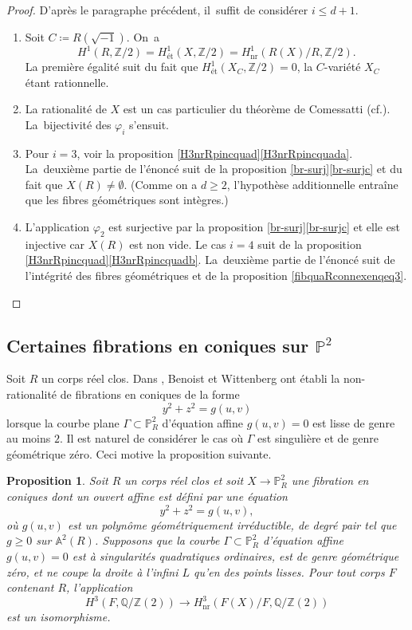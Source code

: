 \documentclass[11pt]{article}
\newcommand{\cf}{cf.\xspace}
\newenvironment{enumeratea}
{\bgroup\def\theenumi{\alph{enumi}}\begin{enumerate}}
{\end{enumerate}\egroup}
\newtheorem{prop}[thm]{Proposition}
\theoremstyle{definition}
\newcommand{\Q}{\mathbb Q}
\newcommand{\Z}{\mathbb Z}
\newcommand{\A}{\mathbb A}
\renewcommand{\P}{\mathbb P}
\newcommand{\on}[1]{\operatorname{#1}}
\let\phi\varphi
\begin{document}
\begin{proof}
D'après le paragraphe précédent, il~suffit de considérer $i\leq d+1$.

\begin{enumeratea}
\item\label{pf:a}
Soit $C\coloneqq R(\sqrt{-1})$. On~a
\[H^1(R,\Z/2)=H^1_{\text{ét}}(X,\Z/2)=H^1_{\on{nr}}(R(X)/R,\Z/2).\]
La première égalité suit du fait que $H^1_{\text{ét}}(X_C,\Z/2)=0$, la $C$-variété $X_C$ étant rationnelle.

\item\label{pf:b}
La rationalité de $X$ est un cas particulier du théorème de Comessatti \cite{comessatti1912fondamenti} (\cf \cite[\S10.2]{colliot2024certaines}). La~bijectivité des $\phi_i$ s'ensuit.

\item\label{pf:c}
Pour $i=3$, voir la proposition \ref{H3nrRpincquad}\eqref{H3nrRpincquada}. La~deuxième partie de l'énoncé suit de la proposition \ref{br-surj}\eqref{br-surjc} et du fait que $X(R)\neq \emptyset$. (Comme on a $d\geq 2$, l'hypothèse additionnelle entraîne que les fibres géométriques sont intègres.)

\item\label{pf:d}
L'application $\phi_2$ est surjective par la proposition \ref{br-surj}\eqref{br-surjc} et elle est injective car $X(R)$ est non vide. Le cas $i=4$ suit de la proposition \ref{H3nrRpincquad}\eqref{H3nrRpincquadb}. La~deuxième partie de l'énoncé suit de l’intégrité des fibres géométriques et de la proposition \ref{fibquaRconnexenqeq3}.\qedhere
\end{enumeratea}
\end{proof}

\subsection{Certaines fibrations en coniques sur \texorpdfstring{$\P^2$}{P2}}
Soit $R$ un corps réel clos. Dans \cite[Prop.\,3.4, Cor.\,3.6]{benoist2020clemens}, Benoist et Wittenberg ont établi la non-rationalité de fibrations en coniques de la forme
\[
y^2+z^2=g(u,v)
\]
lorsque la courbe plane $\Gamma\subset \P^2_R$ d'équation affine $g(u,v)=0$ est lisse de genre au moins $2$. Il est naturel de considérer le cas où $\Gamma$ est singulière et de genre géométrique zéro. Ceci motive la proposition suivante.

\begin{prop}\label{BeWi}
Soit $R$ un corps réel clos et soit $X \to \P^2_{R}$ une fibration en coniques dont un ouvert affine est
défini par une équation
\[
y^2+z^2=g(u,v),
\]
où $g(u,v)$ est un polynôme géométriquement irréductible,
de degré pair tel que $g\geq 0$ sur $\A^2(R)$.
Supposons que la courbe $\Gamma \subset \P^2_R$ d'équation affine $g(u,v)=0$ est à singularités quadratiques ordinaires, est de genre géométrique zéro, et ne coupe la droite
à l'infini $L$ qu'en des points lisses. Pour tout corps $F$ contenant $R$,
l'application
\[
H^3(F,\Q/\Z(2)) \to H^3_{\on{nr}}(F(X)/F,\Q/\Z(2))
\]
est un isomorphisme.
\end{prop}
\end{document}

